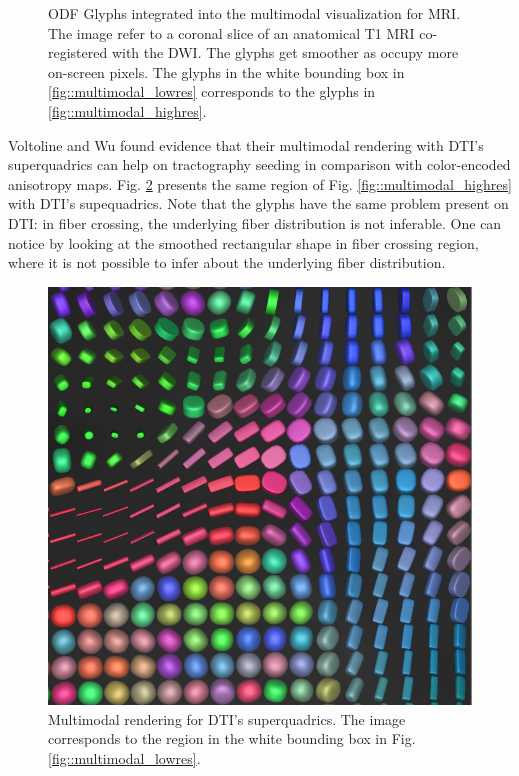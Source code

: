 \documentclass[twoside,twocolumn,10pt]{article}
\begin{document}
\begin{figure}[t]
{    \label{fig::multimodal_highres}
    }
    \caption{ODF Glyphs integrated into the multimodal visualization for MRI. The image refer to a coronal slice of an anatomical T1 MRI co-registered with the DWI. The glyphs get smoother as occupy more on-screen pixels. The glyphs in the white bounding box in \ref{fig::multimodal_lowres} corresponds to the glyphs in \ref{fig::multimodal_highres}.}
    \label{fig::multimodal}
\end{figure}

Voltoline and Wu \cite{voltoline2021} found evidence that their multimodal rendering with DTI's superquadrics can help on tractography seeding in comparison with color-encoded anisotropy maps. Fig. \ref{fig::multimodal_superquadric} presents the same region of Fig. \ref{fig::multimodal_highres} with DTI's supequadrics. Note that the glyphs have the same problem present on DTI: in fiber crossing, the underlying fiber distribution is not inferable. One can notice by looking at the smoothed rectangular shape in fiber crossing region, where it is not possible to infer about the underlying fiber distribution.

\begin{figure}[ht]
    \centering
    \includegraphics[width=.95\linewidth, angle=0]{figs/Results/Connectomme_Volume/HighResImgSuperquadric.png}
    \caption{Multimodal rendering for DTI's superquadrics. The image corresponds to the region in the white bounding box in Fig. \ref{fig::multimodal_lowres}.}
    \label{fig::multimodal_superquadric}
\end{figure}
\end{document}
